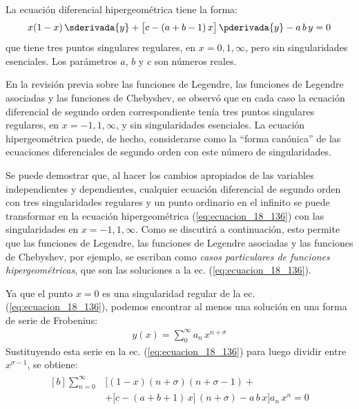 La ecuación diferencial hipergeométrica tiene la forma:
\begin{align}
x (1 - x) \, \sderivada{y} + \big[ c - (a + b - 1) \, x \big] \, \pderivada{y} -  a \, b \, y = 0
\label{eq:ecuacion_18_136}
\end{align}
que tiene tres puntos singulares regulares, en $x = 0, 1, \infty$, pero sin singularidades esenciales. Los parámetros $a$, $b$ y $c$ son números reales.
\par
En la revisión previa sobre las funciones de Legendre, las funciones de Legendre asociadas y las funciones de Chebyshev, se observó que en cada caso la ecuación diferencial de segundo orden correspondiente tenía tres puntos singulares regulares, en $x = -1, 1 , \infty$, y sin singularidades esenciales. La ecuación hipergeométrica puede, de hecho, considerarse como la \enquote{forma canónica} de las ecuaciones diferenciales de segundo orden con este número de singularidades.
\par
Se puede demostrar que, al hacer los cambios apropiados de las variables independientes y dependientes, cualquier ecuación diferencial de segundo orden con tres singularidades regulares y un punto ordinario en el infinito se puede transformar en la ecuación hipergeométrica (\ref{eq:ecuacion_18_136}) con las singularidades en $x= -1 , 1, \infty$. Como se discutirá a continuación, esto permite que las funciones de Legendre, las funciones de Legendre asociadas y las funciones de Chebyshev, por ejemplo, se escriban como \emph{casos particulares de funciones hipergeométricas}, que son las soluciones a la ec. (\ref{eq:ecuacion_18_136}).
\par
Ya que el punto $x = 0$ es una singularidad regular de la ec. (\ref{eq:ecuacion_18_136}), podemos encontrar al menos una solución en una forma de serie de Frobenius:
\begin{align}
y(x) = \sum_{0}^{\infty} a_{n} \, x^{n+\sigma}
\label{eq:ecuacion_18_137}
\end{align}
Sustituyendo esta serie en la ec. (\ref{eq:ecuacion_18_136}) para luego dividir entre $x^{\sigma-1}$, se obtiene:
\begin{align}
\begin{aligned}[b]
\sum_{n=0}^{\infty} &\big[ (1 - x)(n + \sigma)(n + \sigma - 1) + \\[0.5em]
&+ \big[ c - (a + b + 1) \, x] \, (n + \sigma) - a \, b \, x \big] a_{n} \, x^{n} = 0
\end{aligned}
\label{eq:ecuacion_18_138}
\end{align}
